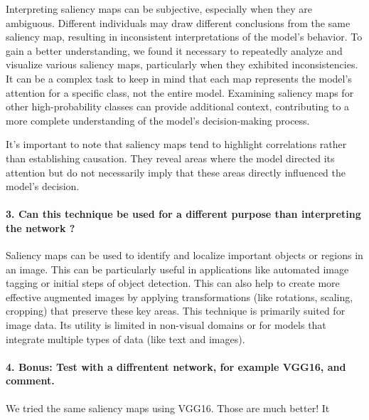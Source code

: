 Interpreting saliency maps can be subjective, especially when they are ambiguous. Different individuals may draw different conclusions from the same saliency map, resulting in inconsistent interpretations of the model's behavior. To gain a better understanding, we found it necessary to repeatedly analyze and visualize various saliency maps, particularly when they exhibited inconsistencies. It can be a complex task to keep in mind that each map represents the model's attention for a specific class, not the entire model. Examining saliency maps for other high-probability classes can provide additional context, contributing to a more complete understanding of the model's decision-making process.

It's important to note that saliency maps tend to highlight correlations rather than establishing causation. They reveal areas where the model directed its attention but do not necessarily imply that these areas directly influenced the model's decision.

\paragraph*{3. Can this technique be used for a different purpose than interpreting the network ?}
Saliency maps can be used to identify and localize important objects or regions in an image. This can be particularly useful in applications like automated image tagging or initial steps of object detection. This can also  help to create more effective augmented images by applying transformations (like rotations, scaling, cropping) that preserve these key areas. This technique is primarily suited for image data. Its utility is limited in non-visual domains or for models that integrate multiple types of data (like text and images).


\paragraph*{4. \textbf{Bonus:} Test with a diffrentent network, for example VGG16, and comment.}
We tried the same saliency maps using VGG16. Those are much better! It  

